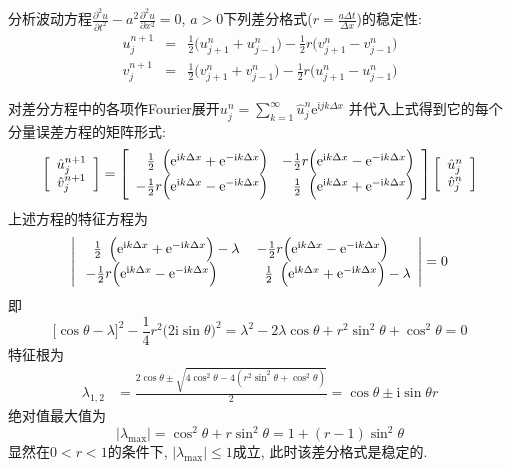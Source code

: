 \begin{problem}[问题7]
分析波动方程$\frac{\partial^2 u}{\partial t^2}-a^2\frac{\partial^2u}{\partial x^2}=0$, $a>0$下列差分格式($r=\frac{a\Delta t}{\Delta x}$)的稳定性:
\begin{eqnarray}
u_j^{n+1} &=& \frac{1}{2}\big(u_{j+1}^n+u_{j-1}^n\big) - \frac{1}{2}r\big(v_{j+1}^n-v_{j-1}^n\big)\nonumber\\
v_j^{n+1} &=& \frac{1}{2}\big(v_{j+1}^n+v_{j-1}^n\big) - \frac{1}{2}r\big(u_{j+1}^n-u_{j-1}^n\big)\nonumber
\end{eqnarray}
\end{problem}

\begin{solution}
对差分方程中的各项作Fourier展开$u_{j}^{n}=\sum_{k=1}^{\infty}\hat{u}_{j}^{n}\mathrm{e}^{\mathrm{i}jk\Delta x}$
并代入上式得到它的每个分量误差方程的矩阵形式:
\[
\left[\begin{array}{c}
\hat{u}_{j}^{n+1}\\
\hat{v}_{j}^{n+1}
\end{array}\right]=\left[\begin{array}{cc}
\hphantom{-}\frac{1}{2}\hphantom{r}\Big(\mathrm{e}^{\mathrm{i}k\Delta x}+\mathrm{e}^{-\mathrm{i}k\Delta x}\Big) & -\frac{1}{2}r\Big(\mathrm{e}^{\mathrm{i}k\Delta x}-\mathrm{e}^{-\mathrm{i}k\Delta x}\Big)\\
-\frac{1}{2}r\Big(\mathrm{e}^{\mathrm{i}k\Delta x}-\mathrm{e}^{-\mathrm{i}k\Delta x}\Big) & \hphantom{-}\frac{1}{2}\hphantom{r}\Big(\mathrm{e}^{\mathrm{i}k\Delta x}+\mathrm{e}^{-\mathrm{i}k\Delta x}\Big)
\end{array}\right]\left[\begin{array}{c}
\hat{u}_{j}^{n}\\
\hat{v}_{j}^{n}
\end{array}\right]
\]
上述方程的特征方程为
\[
\left|\begin{array}{cc}
\hphantom{-}\frac{1}{2}\hphantom{r}\Big(\mathrm{e}^{\mathrm{i}k\Delta x}+\mathrm{e}^{-\mathrm{i}k\Delta x}\Big)-\lambda & -\frac{1}{2}r\Big(\mathrm{e}^{\mathrm{i}k\Delta x}-\mathrm{e}^{-\mathrm{i}k\Delta x}\Big)\hphantom{-\lambda}\\
-\frac{1}{2}r\Big(\mathrm{e}^{\mathrm{i}k\Delta x}-\mathrm{e}^{-\mathrm{i}k\Delta x}\Big)\hphantom{-\lambda} & \hphantom{-}\frac{1}{2}\hphantom{r}\Big(\mathrm{e}^{\mathrm{i}k\Delta x}+\mathrm{e}^{-\mathrm{i}k\Delta x}\Big)-\lambda
\end{array}\right|=0
\]
即
\[
\big[\cos\theta-\lambda\big]^{2}-\frac{1}{4}r^{2}\big(2\mathrm{i}\sin\theta\big)^{2}=\lambda^{2}-2\lambda\cos\theta+r^{2}\sin^{2}\theta+\cos^{2}\theta=0
\]
特征根为
\begin{align*}
\lambda_{1,2} & =\frac{2\cos\theta\pm\sqrt{4\cos^{2}\theta-4(r^{2}\sin^{2}\theta+\cos^{2}\theta)}}{2}=\cos\theta\pm\mathrm{i}\sin\theta r
\end{align*}
绝对值最大值为
\[
|\lambda_{\max}|=\cos^{2}\theta+r\sin^{2}\theta=1+(r-1)\sin^{2}\theta
\]
显然在$0<r<1$的条件下, $|\lambda_{\max}|\leq1$成立, 此时该差分格式是稳定的.
\end{solution} 
